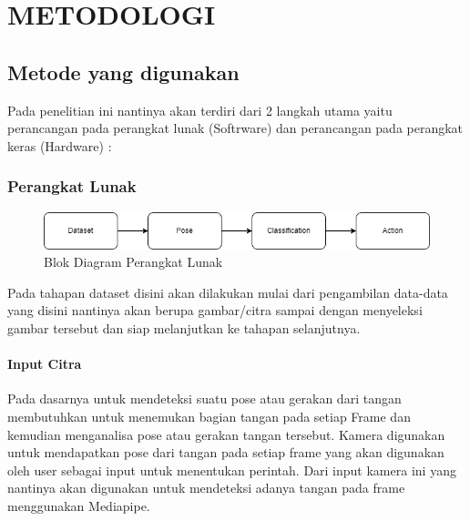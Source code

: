 \section{METODOLOGI}


\subsection{Metode yang digunakan}

Pada penelitian ini nantinya akan terdiri dari 2 langkah utama yaitu perancangan pada perangkat lunak (Softrware) dan perancangan pada perangkat keras (Hardware) :

\subsubsection{Perangkat Lunak}

\begin{figure}
	\centering
	\includegraphics[width=1\linewidth]{gambar/gambar3.1}
	\caption{Blok Diagram Perangkat Lunak}
	\label{fig:Gambar 3.1}
\end{figure}

Pada tahapan dataset disini akan dilakukan mulai dari pengambilan data-data yang disini nantinya akan berupa gambar/citra sampai dengan menyeleksi gambar tersebut dan siap melanjutkan ke tahapan selanjutnya.

\paragraph{Input Citra}
Pada dasarnya untuk mendeteksi suatu pose atau gerakan dari tangan membutuhkan untuk menemukan bagian tangan pada setiap Frame dan kemudian menganalisa pose atau gerakan tangan tersebut. Kamera digunakan untuk mendapatkan pose dari tangan pada setiap frame yang akan digunakan oleh user sebagai input untuk menentukan perintah. Dari input kamera ini yang nantinya akan digunakan untuk mendeteksi adanya tangan pada frame menggunakan Mediapipe.

